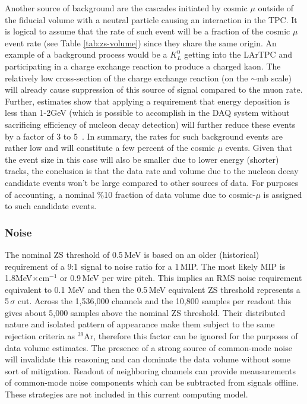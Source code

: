 Another source of background are the cascades initiated by cosmic $\mu$ outside of the fiducial
volume with a neutral particle causing an interaction in the TPC. It is logical to assume that the rate
of such event will be a fraction of the cosmic $\mu$ event rate (see Table \ref{tab:zs-volume})
since they share the same origin. An example of a background process would be a $K_L^0$ getting
into the LArTPC and participating in a charge exchange reaction to produce a charged kaon.
The relatively low cross-section of the charge exchange reaction (on the $\sim$mb scale) will already cause
suppression of this source of signal compared to the muon rate. Further, estimates show that
applying a requirement that energy deposition is less than 1-2GeV (which is possible to accomplish
in the DAQ system without sacrificing efficiency of nucleon decay detection) will further reduce
these events by a factor of 3 to 5~\cite{kudr_bkgd_pdk}.
In summary, the rates for such background events are rather low and will
constitute a few percent of the cosmic $\mu$ events. Given that the event size in this case
will also be smaller due to lower energy (shorter) tracks, the conclusion is that the data rate
and volume due to the nucleon decay candidate events won't be large compared to
other sources of data. For purposes of accounting, a nominal \%10 fraction of data volume due
to cosmic-$\mu$ is assigned to such candidate events.

\subsubsection{Noise}

The nominal ZS threshold of 0.5\,MeV is based on an older (historical) requirement of a
9:1 signal to noise ratio for a 1\,MIP. The most likely MIP is 1.8MeV$\times$cm$^{-1}$ or 0.9\,MeV
per wire pitch. This implies an RMS noise requirement equivalent to 0.1 MeV and then the 0.5\,MeV
equivalent ZS threshold represents a 5\,$\sigma$ cut. Across the 1,536,000 channels and the
10,800 samples per readout this gives about 5,000 samples above the nominal ZS threshold.
Their distributed nature and isolated pattern of appearance make them subject to the same rejection
criteria as $^{39}$Ar, therefore this factor can be ignored for the purposes of data volume estimates.
The presence of a strong source of common-mode noise will invalidate this reasoning and can dominate
the data volume without some sort of mitigation.  Readout of neighboring channels can provide meausurements
of common-mode noise components which can be subtracted from signals offline.  These strategies are not
included in this current computing model.


